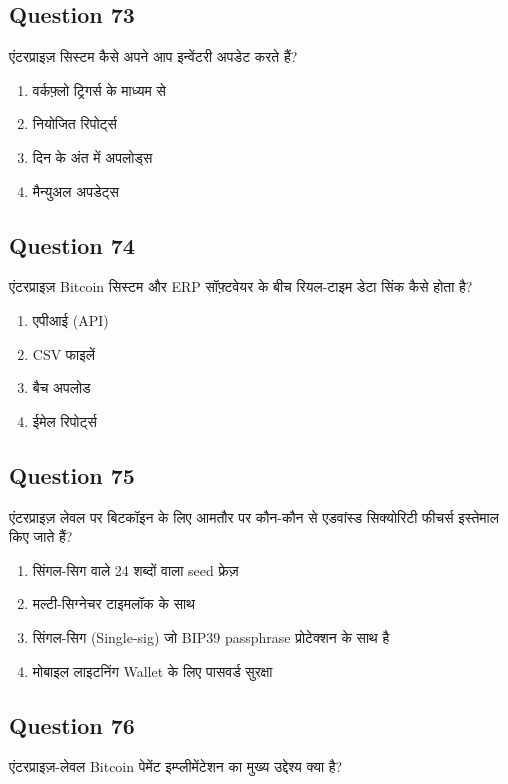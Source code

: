 \documentclass[12pt,a4paper]{article}
\begin{document}
\bigskip


\subsection*{Question 73}
एंटरप्राइज़ सिस्टम कैसे अपने आप इन्वेंटरी अपडेट करते हैं?

\begin{enumerate}[label=\Alph*., leftmargin=*]
\item वर्कफ़्लो ट्रिगर्स के माध्यम से
\item नियोजित रिपोर्ट्स
\item दिन के अंत में अपलोड्स
\item मैन्युअल अपडेट्स
\end{enumerate}

\bigskip


\subsection*{Question 74}
एंटरप्राइज़ Bitcoin सिस्टम और ERP सॉफ़्टवेयर के बीच रियल-टाइम डेटा सिंक कैसे होता है?

\begin{enumerate}[label=\Alph*., leftmargin=*]
\item एपीआई (API)
\item CSV फाइलें
\item बैच अपलोड
\item ईमेल रिपोर्ट्स
\end{enumerate}

\bigskip


\subsection*{Question 75}
एंटरप्राइज़ लेवल पर बिटकॉइन के लिए आमतौर पर कौन-कौन से एडवांस्ड सिक्योरिटी फीचर्स इस्तेमाल किए जाते हैं?

\begin{enumerate}[label=\Alph*., leftmargin=*]
\item सिंगल-सिग वाले 24 शब्दों वाला seed फ्रेज़
\item मल्टी-सिग्नेचर टाइमलॉक के साथ
\item सिंगल-सिग (Single-sig) जो BIP39 passphrase प्रोटेक्शन के साथ है
\item मोबाइल लाइटनिंग Wallet के लिए पासवर्ड सुरक्षा
\end{enumerate}

\bigskip


\subsection*{Question 76}
एंटरप्राइज़-लेवल Bitcoin पेमेंट इम्प्लीमेंटेशन का मुख्य उद्देश्य क्या है?
\end{document}
